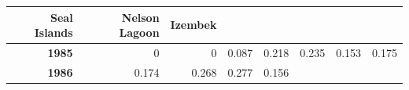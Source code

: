 \documentclass[]{article}
\begin{document}
\begin{longtable}[]{@{}rrrrrrrr@{}}
\begin{minipage}[b]{0.09\columnwidth}
\textbf{Seal Islands}\strut
\end{minipage} & \begin{minipage}[b]{0.08\columnwidth}\raggedleft\strut
\textbf{Nelson Lagoon}\strut
\end{minipage} & \begin{minipage}[b]{0.10\columnwidth}\raggedleft\strut
\textbf{Izembek}\strut
\end{minipage}\tabularnewline
\midrule
\endhead
\begin{minipage}[t]{0.08\columnwidth}\raggedleft\strut
\textbf{1985}\strut
\end{minipage} & \begin{minipage}[t]{0.10\columnwidth}\raggedleft\strut
0\strut
\end{minipage} & \begin{minipage}[t]{0.11\columnwidth}\raggedleft\strut
0\strut
\end{minipage} & \begin{minipage}[t]{0.08\columnwidth}\raggedleft\strut
0.087\strut
\end{minipage} & \begin{minipage}[t]{0.14\columnwidth}\raggedleft\strut
0.218\strut
\end{minipage} & \begin{minipage}[t]{0.09\columnwidth}\raggedleft\strut
0.235\strut
\end{minipage} & \begin{minipage}[t]{0.08\columnwidth}\raggedleft\strut
0.153\strut
\end{minipage} & \begin{minipage}[t]{0.10\columnwidth}\raggedleft\strut
0.175\strut
\end{minipage}\tabularnewline
\begin{minipage}[t]{0.08\columnwidth}\raggedleft\strut
\textbf{1986}\strut
\end{minipage} & \begin{minipage}[t]{0.10\columnwidth}\raggedleft\strut
0.174\strut
\end{minipage} & \begin{minipage}[t]{0.11\columnwidth}\raggedleft\strut
0.268\strut
\end{minipage} & \begin{minipage}[t]{0.08\columnwidth}\raggedleft\strut
0.277\strut
\end{minipage} & \begin{minipage}[t]{0.14\columnwidth}\raggedleft\strut
0.156\strut
\end{minipage} & \begin{minipage}[t]{0.09\columnwidth}\raggedleft\strut

\end{minipage}
\end{longtable}
\end{document}
